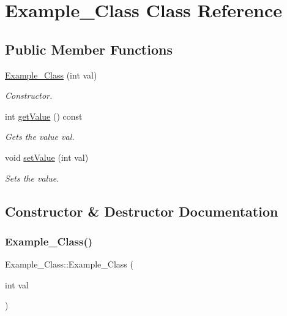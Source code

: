 \hypertarget{classExample__Class}{}\section{Example\+\_\+\+Class Class Reference}
\label{classExample__Class}
\subsection*{Public Member Functions}
\begin{DoxyCompactItemize}
\item 
\hyperlink{classExample__Class_a44450559c0691f9806b057e0e3de36e6}{Example\+\_\+\+Class} (int val)
\begin{DoxyCompactList}\small\item\em Constructor. \end{DoxyCompactList}\item 
int \hyperlink{classExample__Class_a029eda159ecb5e6f2fbb39c549305019}{get\+Value} () const
\begin{DoxyCompactList}\small\item\em Gets the value val. \end{DoxyCompactList}\item 
void \hyperlink{classExample__Class_a78b4cb3bc740ebbae7a263711efce0df}{set\+Value} (int val)
\begin{DoxyCompactList}\small\item\em Sets the value. \end{DoxyCompactList}\end{DoxyCompactItemize}


\subsection{Constructor \& Destructor Documentation}
\mbox{\label{classExample__Class_a44450559c0691f9806b057e0e3de36e6}} 
\subsubsection{\texorpdfstring{Example\+\_\+\+Class()}{Example\_Class()}}
{\footnotesize\ttfamily Example\+\_\+\+Class\+::\+Example\+\_\+\+Class (\begin{DoxyParamCaption}\item[{int}]{val }\end{DoxyParamCaption})}



